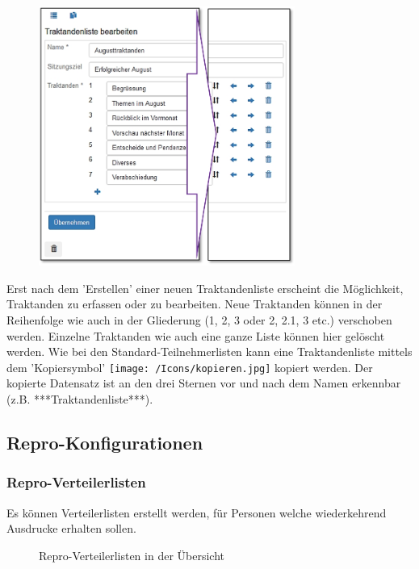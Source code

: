 \begin{figure}
\vspace{-15pt}
\includegraphics[height=85mm]{../chapters/13_Konfigurationen/pictures/13-10_TraktandenlistenBearbeiten.jpg}
\end{figure}

Erst nach dem 'Erstellen' einer neuen Traktandenliste erscheint die Möglichkeit, Traktanden zu erfassen oder zu bearbeiten. Neue Traktanden können in der Reihenfolge wie auch in der Gliederung (1, 2, 3 oder 2, 2.1, 3 etc.) verschoben werden. Einzelne Traktanden wie auch eine ganze Liste können hier gelöscht werden. Wie bei den Standard-Teilnehmerlisten kann eine Traktandenliste mittels dem 'Kopiersymbol' \texttt{[image: /Icons/kopieren.jpg]} kopiert werden. Der kopierte Datensatz ist an den drei Sternen vor und nach dem Namen erkennbar (z.B. ***Traktandenliste***). 

\subsection{Repro-Konfigurationen}

\subsubsection{Repro-Verteilerlisten}

Es können Verteilerlisten erstellt werden, für Personen welche wiederkehrend Ausdrucke erhalten sollen.

\begin{figure}[H]
\caption{Repro-Verteilerlisten in der Übersicht}
\end{figure}

